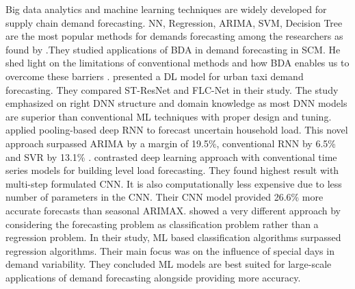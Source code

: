 Big data analytics and machine learning techniques are widely developed for supply chain demand forecasting. NN, Regression, ARIMA, SVM, Decision Tree are the most popular methods for demands forecasting among the researchers as found by \citeauthor*{seyedan_predictive_2020}.They studied applications of BDA in demand forecasting in SCM. He shed light on the limitations of conventional methods and how BDA enables us to overcome these barriers \cite{seyedan_predictive_2020}.
\citeauthor{liao_large-scale_2018} presented a DL model for urban taxi demand forecasting. They compared ST-ResNet and FLC-Net in their study. The study emphasized on right DNN structure and domain knowledge as most DNN models are superior than conventional ML techniques with proper design and tuning\cite{liao_large-scale_2018}. 
\citeauthor*{shi_deep_2018} applied pooling-based deep RNN to forecast uncertain household load. This novel approach surpassed ARIMA by a margin of 19.5\%, conventional RNN by 6.5\% and SVR by 13.1\% \cite{shi_deep_2018}.
\citeauthor*{cai_day-ahead_2019} contrasted deep learning approach with conventional time series models for building level load forecasting. They found highest result with multi-step formulated CNN. It is also computationally less expensive due to less number of parameters in the CNN. Their CNN model provided 26.6\% more accurate forecasts than seasonal ARIMAX\cite{cai_day-ahead_2019}.
\citeauthor{huber_daily_2020} showed a very different approach by considering the forecasting problem as classification problem rather than a regression problem. In their study, ML based classification algorithms surpassed regression algorithms. Their main focus was on the influence of special days in demand variability. They concluded ML models are best suited for large-scale applications of demand forecasting alongside providing more accuracy\cite{huber_daily_2020}.
